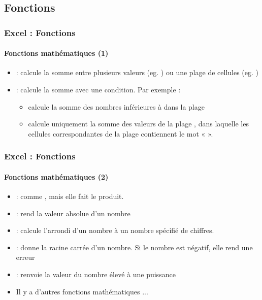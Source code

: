 \documentclass[xcolor=table, usenames,dvipsnames]{beamer}
\begin{document}
\subsection{Fonctions}

\begin{frame}
\frametitle{Excel : Fonctions}
\framesubtitle{Fonctions mathématiques (1)}
\begin{minipage}{0.81\textwidth}
\begin{itemize}
	\item {} : calcule la somme entre plusieurs valeurs (eg. ) ou une plage de cellules (eg. )
	\item {} : calcule la somme avec une condition. Par exemple : 
	\begin{itemize}
		\item {} calcule la somme des nombres inférieures à  dans la plage 
		\item {} calcule uniquement la somme des valeurs de la plage , dans laquelle les cellules correspondantes de la plage  contiennent le mot «  ».
	\end{itemize}
\end{itemize}
\end{minipage}
%
\begin{minipage}{0.18\textwidth}
	
\end{minipage}
\end{frame}

\begin{frame}
\frametitle{Excel : Fonctions}
\framesubtitle{Fonctions mathématiques (2)}
\begin{minipage}{0.81\textwidth}
	\begin{itemize}
		\item {} : comme , mais elle fait le produit.
		\item {} : rend la valeur absolue d'un nombre
		\item {} : calcule l'arrondi d'un nombre à un nombre spécifié de chiffres.
		\item {} : donne la racine carrée d'un nombre. Si le nombre est négatif, elle rend une erreur 
		\item {} : renvoie la valeur du nombre élevé à une puissance
		\item Il y a d'autres fonctions mathématiques ...
	\end{itemize}
\end{minipage}
%
\begin{minipage}{0.18\textwidth}
	
\end{minipage}
\end{frame}
\end{document}
